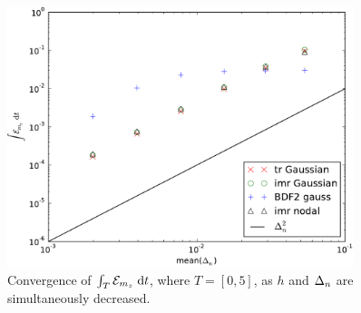 \begin{figure}
  \centering
  \includegraphics[width=0.9\textwidth]{plots/2d_wave_solution_convergence_long_time/auxerr1integralvsmeanofdts.pdf}
  \caption{Convergence of ${\int_T {\mathcal{E}_{m_z}} {\; \mathrm{{d}}} t}$, where $T=[0,5]$, as $h$ and $\Delta_{n}$ are simultaneously decreased.}
  \label{fig:convergence-long-time-mz-norm}
\end{figure}


